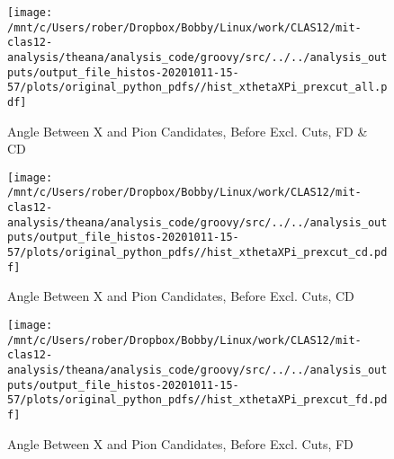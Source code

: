 \documentclass{article}
\begin{document}
\begin{landscape}
    \begin{figure}[h]
        \centering

        \texttt{[image: /mnt/c/Users/rober/Dropbox/Bobby/Linux/work/CLAS12/mit-clas12-analysis/theana/analysis\_code/groovy/src/../../analysis\_outputs/output\_file\_histos-20201011-15-57/plots/original\_python\_pdfs//hist\_xthetaXPi\_prexcut\_all.pdf]}
        \captionsetup{textformat=empty,labelformat=blank}
        \caption{Angle Between X and Pion Candidates, Before Excl. Cuts, FD \& CD}
    \end{figure}
    \clearpage
    
    \begin{figure}[h]
        \centering

        \texttt{[image: /mnt/c/Users/rober/Dropbox/Bobby/Linux/work/CLAS12/mit-clas12-analysis/theana/analysis\_code/groovy/src/../../analysis\_outputs/output\_file\_histos-20201011-15-57/plots/original\_python\_pdfs//hist\_xthetaXPi\_prexcut\_cd.pdf]}
        \captionsetup{textformat=empty,labelformat=blank}
        \caption{Angle Between X and Pion Candidates, Before Excl. Cuts, CD}
    \end{figure}
    \clearpage
    
    \begin{figure}[h]
        \centering

        \texttt{[image: /mnt/c/Users/rober/Dropbox/Bobby/Linux/work/CLAS12/mit-clas12-analysis/theana/analysis\_code/groovy/src/../../analysis\_outputs/output\_file\_histos-20201011-15-57/plots/original\_python\_pdfs//hist\_xthetaXPi\_prexcut\_fd.pdf]}
        \captionsetup{textformat=empty,labelformat=blank}
        \caption{Angle Between X and Pion Candidates, Before Excl. Cuts, FD}
    \end{figure}
    \clearpage
    
	\end{landscape}
	
\end{document}
